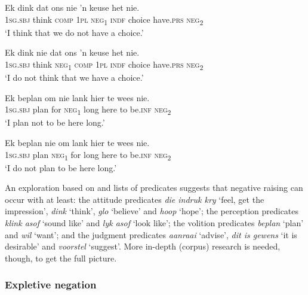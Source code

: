\documentclass[output=paper,colorlinks,citecolor=brown]{langscibook}
\begin{document}
\ea\label{ex:afr:48}
    \ea\label{ex:afr:48a}
        \gll Ek dink dat ons nie ’n keuse het nie. \\ 
             \textsc{1sg.sbj} think \textsc{comp} \textsc{1pl} \textsc{neg}\textsubscript{1} \textsc{indf} choice  have.\textsc{prs} \textsc{neg}\textsubscript{2} \\
        \glt ‘I think that we do not have a choice.’
    
    \ex\label{ex:afr:48b}
        \gll Ek dink nie dat ons ’n keuse het nie. \\
             \textsc{1sg.sbj} think \textsc{neg}\textsubscript{1} \textsc{comp} \textsc{1pl} \textsc{indf} choice  have.\textsc{prs} \textsc{neg}\textsubscript{2} \\
        \glt ‘I do not think that we have a choice.’
  
    \ex\label{ex:afr:48c}
        \gll Ek beplan om nie lank hier te wees nie. \\ 
             \textsc{1sg.sbj} plan for \textsc{neg}\textsubscript{1} long here to be.\textsc{inf} \textsc{neg}\textsubscript{2} \\
        \glt ‘I plan not to be here long.’
    
    \ex\label{ex:afr:48d}
        \gll Ek beplan nie om lank hier te wees nie. \\
             \textsc{1sg.sbj} plan    \textsc{neg}\textsubscript{1} for long here to be.\textsc{inf} \textsc{neg}\textsubscript{2}\\
        \glt ‘I do not plan to be here long.’
    \z
\z 

An exploration based on  and  lists of predicates suggests that negative raising can occur with at least: the attitude predicates \textit{die indruk kry} ‘feel, get the impression’, \textit{dink} ‘think’, \textit{glo} ‘believe’ and \textit{hoop} ‘hope’; the perception predicates \textit{klink asof} ‘sound like’ and \textit{lyk asof} ‘look like’; the volition predicates \textit{beplan} ‘plan’ and \textit{wil} ‘want’; and the judgment predicates \textit{aanraai} ‘advise’, \textit{dit is gewens} ‘it is desirable’ and \textit{voorstel} ‘suggest’. More in-depth (corpus) research is needed, though, to get the full picture.

\subsubsection{Expletive negation}
\end{document}
